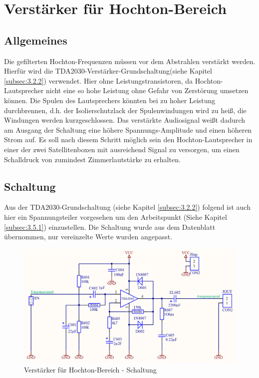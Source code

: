 \null\newpage
\section{Verstärker für Hochton-Bereich}\label{sec:4.5}
\subsection{Allgemeines}\label{subsec:4.5.1}
Die gefilterten Hochton-Frequenzen müssen vor dem Abstrahlen verstärkt werden.
Hierfür wird die TDA2030-Verstärker-Grundschaltung(siehe Kapitel \ref{subsec:3.2.2}) verwendet.
Hier ohne Leistungstransistoren, da Hochton-Lautsprecher nicht eine so hohe Leistung ohne Gefahr von Zerstörung umsetzen können.
Die Spulen des Lautsprechers könnten bei zu hoher Leistung durchbrennen, d.h. der Isolierschutzlack der Spulenwindungen wird zu heiß, die Windungen werden kurzgeschlossen.
Das verstärkte Audiosignal weißt dadurch am Ausgang der Schaltung eine höhere Spannungs-Amplitude und einen höheren Strom auf.
Es soll nach diesem Schritt möglich sein den Hochton-Lautsprecher in einer der zwei Satellitenboxen mit ausreichend Signal zu versorgen, um einen Schalldruck von zumindest Zimmerlautstärke zu erhalten. 


\subsection{Schaltung}\label{subsec:4.5.2}
Aus der TDA2030-Grundschaltung (siehe Kapitel \ref{subsec:3.2.2}) folgend ist auch hier ein Spannungsteiler vorgesehen um den Arbeitspunkt (Siehe Kapitel \ref{subsec:3.5.1}) einzustellen.
Die Schaltung wurde aus dem Datenblatt übernommen, nur vereinzelte Werte wurden angepasst. 

\begin{figure} [H]
	\centering	
	\includegraphics[width=1\textwidth]{img/Print6/HTVerstaerker-Schem.PNG}
	\caption{Verstärker für Hochton-Bereich - Schaltung}
	\label {fig:4.5.2.1}
\end{figure}



